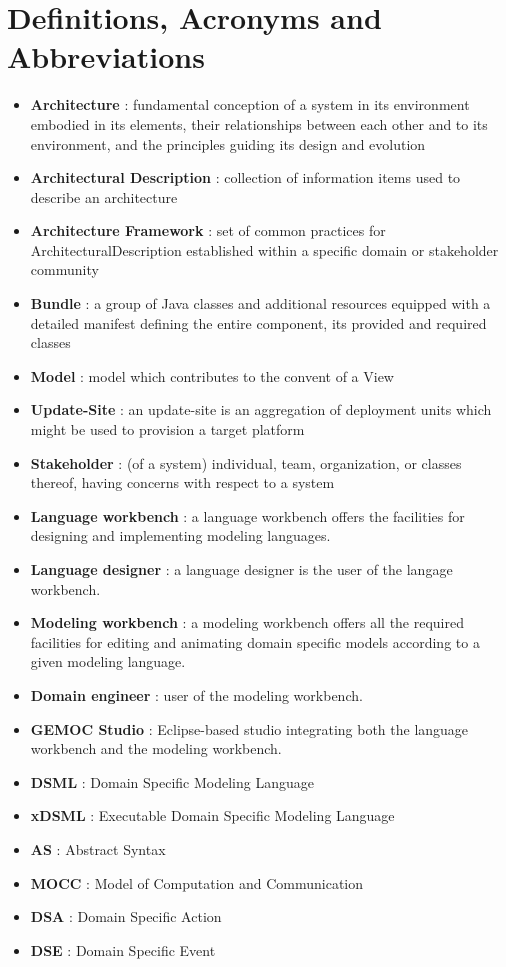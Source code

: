 \documentclass{gemoc} %
\begin{document}

\section{Definitions, Acronyms and Abbreviations}
\begin{itemize}
	\item \textbf{Architecture}  : fundamental conception of a system in its environment
 embodied in its elements, their relationships between each other and to its 
environment, and the principles guiding its design and evolution
	\item \textbf{Architectural Description} : collection of information items used to describe an architecture
	\item \textbf{Architecture Framework} : set of common practices for ArchitecturalDescription established within a specific domain or stakeholder community
	\item \textbf{Bundle} : a group of Java classes and additional resources equipped with a detailed manifest defining the entire component, its provided and required classes
	\item \textbf{Model} : model which contributes to the convent of a View
	\item \textbf{Update-Site} : an update-site is an aggregation of deployment units which might be used to provision a target platform
	\item \textbf{Stakeholder} : (of a system) individual, team, organization, or classes thereof, having concerns with respect to a system 
	\item \textbf{Language workbench} : a language workbench offers the facilities for designing and implementing modeling languages.
	\item \textbf{Language designer} : a language designer is the user of the langage workbench.
	\item \textbf{Modeling workbench} : a modeling workbench offers all the required facilities for editing and animating domain specific models according to a given modeling language.
	\item \textbf{Domain engineer} : user of the modeling workbench.
	\item \textbf{GEMOC Studio} : Eclipse-based studio integrating both the language workbench and the modeling workbench.
	\item \textbf{DSML} : Domain Specific Modeling Language
	\item \textbf{xDSML} : Executable Domain Specific Modeling Language
	\item \textbf{AS} : Abstract Syntax
	\item \textbf{MOCC} : Model of Computation and Communication
	\item \textbf{DSA} : Domain Specific Action
	\item \textbf{DSE} : Domain Specific Event
\end{itemize}
\end{document}
